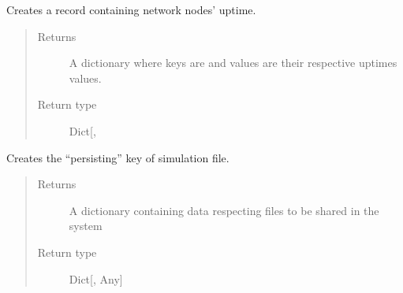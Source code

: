 \documentclass[letterpaper,10pt,english]{sphinxmanual}
\begin{document}
\begin{fulllineitems}
\label{\detokenize{app:app.simfile_generator._init_nodes_uptime}}
Creates a record containing network nodes’ uptime.
\begin{quote}\begin{description}
\item[{Returns}] \leavevmode
A dictionary where keys are
{\hyperref[\detokenize{app.domain:app.domain.network_nodes.Node.id}]{}}
and values are their respective uptimes
{\hyperref[\detokenize{app.domain:app.domain.network_nodes.Node.uptime}]{}} values.

\item[{Return type}] \leavevmode
Dict{[}, \sphinxhref{https://docs.python.org/3.7/library/functions.html\#float}{float}{]}

\end{description}\end{quote}

\end{fulllineitems}


\begin{fulllineitems}
\label{\detokenize{app:app.simfile_generator._init_persisting_dict}}
Creates the “persisting” key of simulation file.
\begin{quote}\begin{description}
\item[{Returns}] \leavevmode
A dictionary containing data respecting files to be shared in the system

\item[{Return type}] \leavevmode
Dict{[}, Any{]}

\end{description}\end{quote}

\end{fulllineitems}

\end{document}
